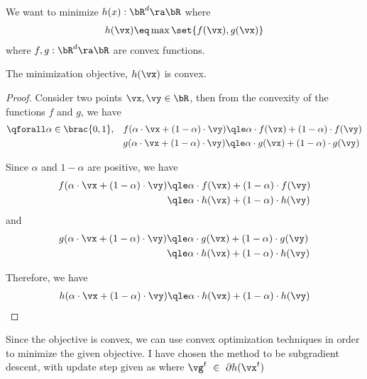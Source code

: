 \documentclass{article}
\newcommand{\x}[1]{\vx^{#1}}
\begin{document}
\begin{question}

	We want to minimize $h(x) : \bR^d \ra \bR$ where
	\begin{align*}
		h(\vx) \eq \max \set{f(\vx), g(\vx)}
	\end{align*}
	where $f, g : \bR^d \ra \bR$ are convex functions.

	\begin{claim}
		The minimization objective, $h(\vx)$ is convex.

		\begin{proof}
			Consider two points $\vx, \vy \in \bR$, then from the convexity of the functions $f$ and $g$, we have
			\begin{align*}
				\qforall \alpha \in \brac{0, 1}, \quad & f(\alpha \cdot \vx + (1 - \alpha) \cdot \vy) \qle \alpha \cdot f(\vx) + (1 - \alpha) \cdot f(\vy) \\
				& g(\alpha \cdot \vx + (1 - \alpha) \cdot \vy) \qle \alpha \cdot g(\vx) + (1 - \alpha) \cdot g(\vy)
			\end{align*}

			Since $\alpha$ and $1 - \alpha$ are positive, we have
			\begin{align*}
				f(\alpha \cdot \vx + (1 - \alpha) \cdot \vy) &\qle \alpha \cdot f(\vx) + (1 - \alpha) \cdot f(\vy) \\
				&\qle \alpha \cdot h(\vx) + (1 - \alpha) \cdot h(\vy)
			\end{align*}
			and
			\begin{align*}
				g(\alpha \cdot \vx + (1 - \alpha) \cdot \vy) &\qle \alpha \cdot g(\vx) + (1 - \alpha) \cdot g(\vy) \\
				&\qle \alpha \cdot h(\vx) + (1 - \alpha) \cdot h(\vy)
			\end{align*}

			Therefore, we have
			\begin{align*}
				h(\alpha \cdot \vx + (1 - \alpha) \cdot \vy) &\qle \alpha \cdot h(\vx) + (1 - \alpha) \cdot h(\vy) \\
			\end{align*}
		\end{proof}
	\end{claim}

	Since the objective is convex, we can use convex optimization techniques in order to minimize the given objective. I have chosen the method to be subgradient descent, with update step given as
	\answer{
	\begin{align*}
			\x{t + 1} \eq \x{t} - \eta_t \cdot \vg^t
		\end{align*}
	}
	where $\vg^t \ \in \ \partial h(\x{t})$


\end{question}
\end{document}
